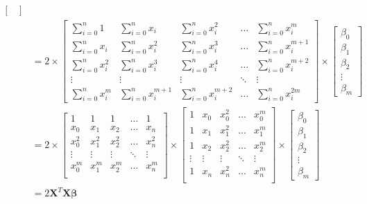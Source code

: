 \documentclass{article}
\newcommand{\X}{\mathbf{X}}
\newcommand{\B}{\boldsymbol\beta} %
\begin{document}
\begin{equation}
\begin{split}
\begin{bmatrix}
    \end{bmatrix}\\
    & = 2 \times
    \begin{bmatrix}
        \sum_{i=0}^{n} 1 & \sum_{i=0}^{n} x_i & \sum_{i=0}^{n} x_i ^2 & \ldots & \sum_{i=0}^{n} x_i ^m\\
        \sum_{i=0}^{n} x_i & \sum_{i=0}^{n} x_i ^2 & \sum_{i=0}^{n} x_i ^3 & \ldots & \sum_{i=0}^{n} x_i ^{m+1}\\
        \sum_{i=0}^{n} x_i ^2 & \sum_{i=0}^{n} x_i ^3 & \sum_{i=0}^{n} x_i ^4 & \ldots & \sum_{i=0}^{n} x_i ^{m+2}\\
        \vdots & \vdots & \vdots & \ddots & \vdots \\
        \sum_{i=0}^{n} x_i ^{m} & \sum_{i=0}^{n} x_i ^{m+1} & \sum_{i=0}^{n} x_i ^{m+2} & \ldots & \sum_{i=0}^{n} x_i ^{2m}
    \end{bmatrix}
    \times
    \begin{bmatrix}
        \beta_0 \\
        \beta_1 \\
        \beta_2 \\
        \vdots \\
        \beta_m
    \end{bmatrix}\\
    & = 2 \times
    \begin{bmatrix}
        1 & 1 & 1 & \ldots & 1 \\
        x_0 & x_1 & x_2 & \ldots & x_n \\
        x_0^2 & x_1^2 & x_2 ^2 & \ldots & x_n^2 \\
        \vdots & \vdots & \vdots & \ddots & \vdots \\
        x_0^m & x_1^m & x_2 ^m & \ldots & x_n^m \\
    \end{bmatrix}
    \times
    \begin{bmatrix}
        1 & x_0 & x_0 ^2 & \ldots & x_0^m \\
        1 & x_1 & x_1 ^2 & \ldots & x_1^m \\
        1 & x_2 & x_2 ^2 & \ldots & x_2^m \\
        \vdots & \vdots & \vdots & \ddots & \vdots \\
        1 & x_n & x_n ^2 & \ldots & x_n^m \\
    \end{bmatrix}
    \times
    \begin{bmatrix}
        \beta_0 \\
        \beta_1 \\
        \beta_2 \\
        \vdots \\
        \beta_m
    \end{bmatrix}\\
    &= 2\X ^T \X \B
\end{split}
\end{equation}
\end{document}
